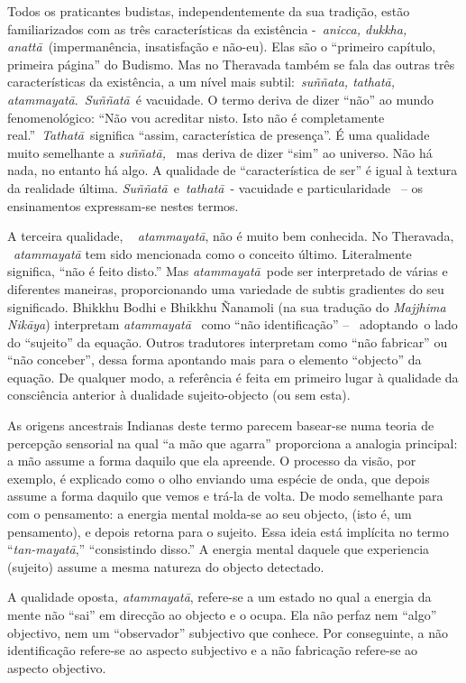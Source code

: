 Todos os praticantes budistas, independentemente da sua tradição, estão
familiarizados com as três características da existência -~\emph{anicca,
dukkha, anattā}~(impermanência, insatisfação e não-eu). Elas são o
``primeiro capítulo, primeira página'' do Budismo. Mas no Theravada
também se fala das outras três características da existência, a um nível
mais subtil:~\emph{suññata, tathatā, atammayatā}.~\emph{Suññatā}~é
vacuidade. O termo deriva de dizer ``não'' ao mundo fenomenológico:
``Não vou acreditar nisto. Isto não é completamente
real.''~\emph{Tathatā}~significa ``assim, característica de presença''.
É uma qualidade muito semelhante a \emph{suññatā,} ~mas deriva de dizer
``sim'' ao universo. Não há nada, no entanto há algo. A qualidade de
``característica de ser'' é igual à textura da realidade última.
\emph{Suññatā}~e~\emph{tathatā}~- vacuidade e particularidade ~-- os
ensinamentos expressam-se nestes termos.

A terceira qualidade, ~ \emph{atammayatā}, não é muito bem conhecida. No
Theravada, ~\emph{atammayatā} tem sido mencionada como o conceito
último. Literalmente significa, ``não é feito disto.'' Mas
\emph{atammayatā}~pode ser interpretado de várias e diferentes maneiras,
proporcionando uma variedade de subtis gradientes do seu significado.
Bhikkhu Bodhi e Bhikkhu Ñanamoli (na sua tradução do \emph{Majjhima
Nikāya}) interpretam \emph{atammayatā}~ como ``não identificação'' --
~adoptando~o lado do ``sujeito'' da equação. Outros tradutores
interpretam como ``não fabricar'' ou ``não conceber'', dessa forma
apontando mais para o elemento ``objecto'' da equação. De qualquer modo,
a referência é feita em primeiro lugar à qualidade da consciência
anterior à dualidade sujeito-objecto (ou sem esta).~

As origens ancestrais Indianas deste termo parecem basear-se numa teoria
de percepção sensorial na qual ``a mão que agarra'' proporciona a
analogia principal: a mão assume a forma daquilo que ela apreende. O
processo da visão, por exemplo, é explicado como o olho enviando uma
espécie de onda, que depois assume a forma daquilo que vemos e trá-la de
volta. De modo semelhante para com o pensamento: a energia mental
molda-se ao seu objecto, (isto é, um pensamento), e depois retorna para
o sujeito. Essa ideia está implícita no termo ``\emph{tan-mayatā},''
``consistindo disso.'' A energia mental daquele que experiencia
(sujeito) assume a mesma natureza do objecto detectado.

A qualidade oposta\emph{, atammayatā}, refere-se a um estado no qual a
energia da mente não ``sai'' em direcção ao objecto e o ocupa. Ela não
perfaz nem ``algo'' objectivo, nem um ``observador'' subjectivo que
conhece. Por conseguinte, a não identificação refere-se ao aspecto
subjectivo e a não fabricação refere-se ao aspecto objectivo.

